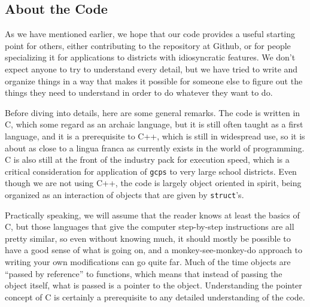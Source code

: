 \documentclass[12pt]{article}
\theoremstyle{definition}
\begin{document}
\begin{appendix}

\section{About the Code} \label{app:Code}

As we have mentioned earlier, we hope that our code provides a useful
starting point for others, either contributing to the repository at
Github, or for people specializing it for applications to districts
with idiosyncratic features.  We don't expect anyone to try to
understand every detail, but we have tried to write and organize
things in a way that makes it possible for someone else to figure out
the things they need to understand in order to do whatever they want
to do.

Before diving into details, here are some general remarks.  The code
is written in C, which some regard as an archaic language, but it is
still often taught as a first language, and it is a prerequisite to
C++, which is still in widespread use, so it is about as close to a
lingua franca as currently exists in the world of programming.  C is
also still at the front of the industry pack for execution speed,
which is a critical consideration for application of \texttt{gcps} to
very large school districts.  Even though we are not using C++, the
code is largely object oriented in spirit, being organized as an
interaction of objects that are given by \texttt{struct}'s.

Practically speaking, we will assume that the reader knows at least
the basics of C, but those languages that give the computer
step-by-step instructions are all pretty similar, so even without
knowing much, it should mostly be possible to have a good sense of
what is going on, and a monkey-see-monkey-do approach to writing your
own modifications can go quite far.  Much of the time objects are
``passed by reference'' to functions, which means that instead of
passing the object itself, what is passed is a pointer to the object.
Understanding the pointer concept of C is certainly a prerequisite to
any detailed understanding of the code.


\end{appendix}
\end{document}
